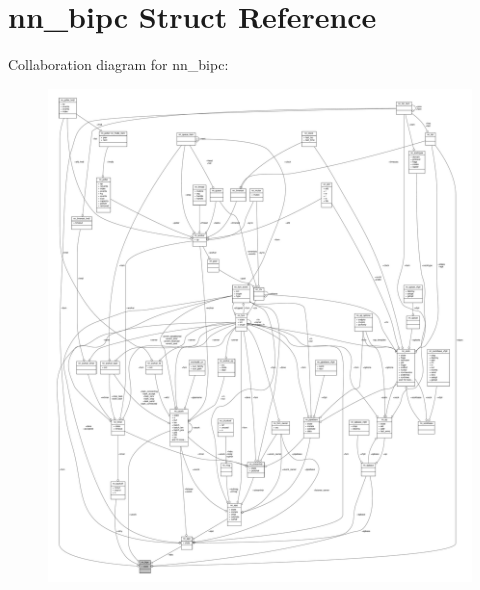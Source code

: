 \hypertarget{structnn__bipc}{}\section{nn\+\_\+bipc Struct Reference}
\label{structnn__bipc}


Collaboration diagram for nn\+\_\+bipc\+:\nopagebreak
\begin{figure}[H]
\begin{center}
\leavevmode
\includegraphics[width=350pt]{structnn__bipc__coll__graph}
\end{center}
\end{figure}
